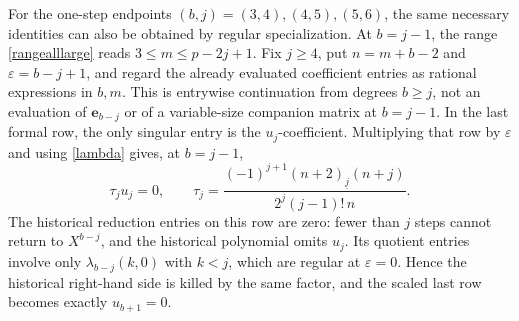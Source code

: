 \documentclass[10pt,a4paper]{amsart}
\newcommand{\fall}[2]{(#1)_{\underline{#2}}}
\begin{document}
For the one-step endpoints $(b,j)=(3,4),(4,5),(5,6)$, the same
necessary identities can also be obtained by regular specialization.
At $b=j-1$, the range \eqref{rangealllarge} reads
$3\le m\le p-2j+1$.
Fix $j\ge4$, put $n=m+b-2$ and $\varepsilon=b-j+1$, and regard the
already evaluated coefficient entries as rational expressions in
$b,m$.  This is entrywise continuation from degrees $b\ge j$, not
an evaluation of $\mathbf e_{b-j}$ or of a variable-size companion matrix at
$b=j-1$.  In the last formal row, the only singular entry is the
$u_j$-coefficient.  Multiplying that row by $\varepsilon$ and using
\eqref{lambda} gives, at $b=j-1$,
\[
 \tau_j u_j=0,
 \qquad
 \tau_j=\frac{(-1)^{j+1}\fall{n+2}{j}(n+j)}
                  {2^j(j-1)!\,n}.
\]
The historical reduction entries on this row are zero: fewer than $j$
steps cannot return to $X^{b-j}$, and the historical polynomial omits
$u_j$.  Its quotient entries involve only $\lambda_{b-j}(k,0)$ with
$k<j$, which are regular at $\varepsilon=0$.  Hence the historical right-hand
side is killed by the same factor, and the scaled last row becomes
exactly $u_{b+1}=0$.
\end{document}
